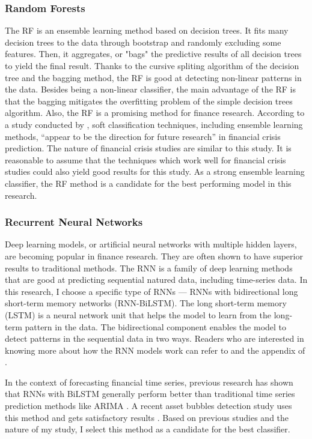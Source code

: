 \documentclass[12pt, man, a4paper, floatsintext]{apa7}
\begin{document}
\subsubsection{Random Forests}

The RF is an ensemble learning method based on decision trees. It fits many decision trees to the data through bootstrap and randomly excluding some features. Then, it aggregates, or "bags" the predictive results of all decision trees to yield the final result. Thanks to the cursive spliting algorithm of the decision tree and the bagging method, the RF is good at detecting non-linear patterns in the data. Besides being a non-linear classifier, the main advantage of the RF is that the bagging mitigates the overfitting problem of the simple decision trees algorithm. Also, the RF is a promising method for finance research. According to a study conducted by \textcite{LinSurvey}, soft classification techniques, including ensemble learning methods, “appear to be the direction for future research” in financial crisis prediction. The nature of financial crisis studies are similar to this study. It is reasonable to assume that the techniques which work well for financial crisis studies could also yield good results for this study. As a strong ensemble learning classifier, the RF method is a candidate for the best performing model in this research.

\subsubsection{Recurrent Neural Networks}

Deep learning models, or artificial neural networks with multiple hidden layers, are becoming popular in finance research. They are often shown to have superior results to traditional methods. The RNN is a family of deep learning methods that are good at predicting sequential natured data, including time-series data. In this research, I choose a specific type of RNNs — RNNs with bidirectional long short-term memory networks (RNN-BiLSTM). The long short-term memory (LSTM) is a neural network unit that helps the model to learn from the long-term pattern in the data. The bidirectional component enables the model to detect patterns in the sequential data in two ways. Readers who are interested in knowing more about how the RNN models work can refer to \textcite{lstm} and the appendix of \textcite{Bash2020}.

In the context of forecasting financial time series, previous research has shown that RNNs with BiLSTM generally perform better than traditional time series prediction methods like ARIMA \parencite{Siam2019}. A recent asset bubbles detection study uses this method and gets satisfactory results \parencite{Bash2020}. Based on previous studies and the nature of my study, I select this method as a candidate for the best classifier. 
\end{document}

